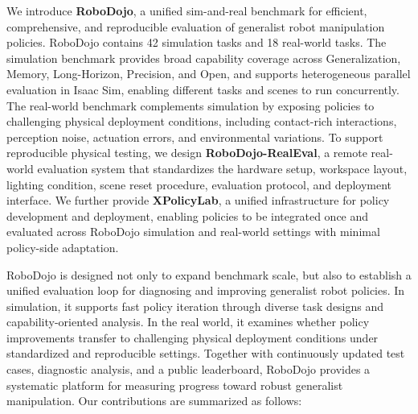 We introduce \textbf{\textcolor{Blue_1}{RoboDojo}}, a unified sim-and-real benchmark for efficient, comprehensive, and reproducible evaluation of generalist robot manipulation policies. RoboDojo contains 42 simulation tasks and 18 real-world tasks. The simulation benchmark provides broad capability coverage across Generalization, Memory, Long-Horizon, Precision, and Open, and supports heterogeneous parallel evaluation in Isaac Sim, enabling different tasks and scenes to run concurrently. The real-world benchmark complements simulation by exposing policies to challenging physical deployment conditions, including contact-rich interactions, perception noise, actuation errors, and environmental variations. To support reproducible physical testing, we design \textbf{\textcolor{Blue_1}{RoboDojo-RealEval}}, a remote real-world evaluation system that standardizes the hardware setup, workspace layout, lighting condition, scene reset procedure, evaluation protocol, and deployment interface. We further provide \textbf{\textcolor{Blue_1}{XPolicyLab}}, a unified infrastructure for policy development and deployment, enabling policies to be integrated once and evaluated across RoboDojo simulation and real-world settings with minimal policy-side adaptation.

RoboDojo is designed not only to expand benchmark scale, but also to establish a unified evaluation loop for diagnosing and improving generalist robot policies. In simulation, it supports fast policy iteration through diverse task designs and capability-oriented analysis. In the real world, it examines whether policy improvements transfer to challenging physical deployment conditions under standardized and reproducible settings. Together with continuously updated test cases, diagnostic analysis, and a public leaderboard, RoboDojo provides a systematic platform for measuring progress toward robust generalist manipulation. Our contributions are summarized as follows:

